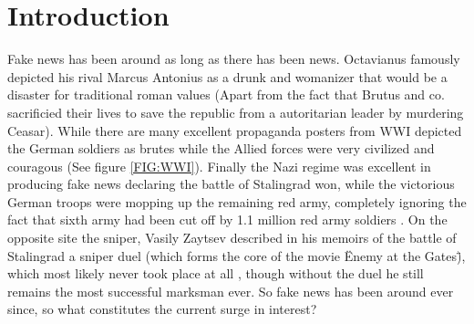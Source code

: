 \documentclass[10pt, a4paper, twocolumn]{article} %
\begin{document}
\section{Introduction}
Fake news has been around as long as there has been news. Octavianus famously depicted his rival Marcus Antonius as a drunk and womanizer that would be a disaster for traditional roman values \cite{kaminska2017} (Apart from the fact that Brutus and co. sacrificied their lives to save the republic from a autoritarian leader by murdering Ceasar). While there are many excellent propaganda posters from WWI depicted the German soldiers as brutes while the Allied forces were very civilized and couragous (See figure \ref{FIG:WWI}). Finally the Nazi regime was excellent in producing fake news declaring the battle of Stalingrad won, while the victorious German troops were mopping up the remaining red army, completely ignoring the fact that sixth army had been cut off by 1.1 million red army soldiers \cite{baird1969}. On the opposite site the sniper, Vasily Zaytsev described in his memoirs of the battle of Stalingrad a sniper duel (which forms the core of the movie \"Enemy at the Gates\"), which most likely never took place at all \cite{ellis2013}, though without the duel he still remains the most successful marksman ever. So fake news has been around ever since, so what constitutes the current surge in interest?
\end{document}
